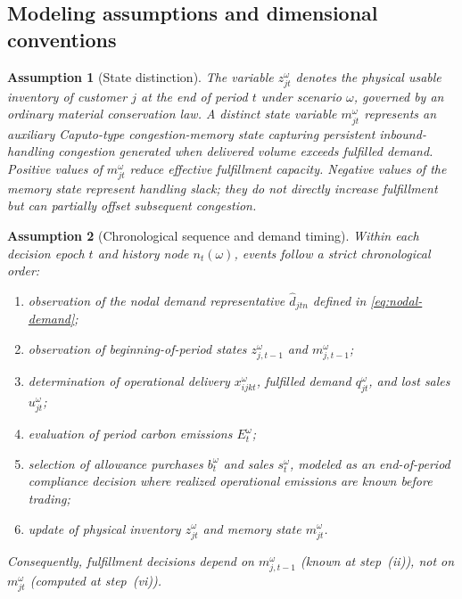 \documentclass[11pt,a4paper]{article}
\newtheorem{assumption}{Assumption}
\begin{document}
\subsection{Modeling assumptions and dimensional conventions}
\label{sec:assumptions}

\begin{assumption}[State distinction]
\label{ass:state}
The variable \(z_{jt}^{\omega}\) denotes the physical usable inventory of
customer \(j\) at the end of period \(t\) under scenario \(\omega\), governed
by an ordinary material conservation law. A distinct state variable \(m_{jt}^{\omega}\) represents an auxiliary
Caputo-type congestion-memory state capturing persistent inbound-handling congestion
generated when delivered volume exceeds fulfilled demand. Positive values
of \(m_{jt}^{\omega}\) reduce effective fulfillment capacity. Negative values of the memory state
represent handling slack; they do not directly increase fulfillment
but can partially offset subsequent congestion.
\end{assumption}

\begin{assumption}[Chronological sequence and demand timing]
\label{ass:chronology}
Within each decision epoch \(t\) and history node \(n_t(\omega)\), events
follow a strict chronological order:
\begin{enumerate}[label=(\roman*)]
  \item observation of the nodal demand representative
  \(\widehat{d}_{jtn}\) defined in \cref{eq:nodal-demand};
  \item observation of beginning-of-period states
  \(z_{j,t-1}^{\omega}\) and \(m_{j,t-1}^{\omega}\);
  \item determination of operational delivery
  \(x_{ijkt}^{\omega}\), fulfilled demand \(q_{jt}^{\omega}\), and
  lost sales \(u_{jt}^{\omega}\);
  \item evaluation of period carbon emissions \(E_t^\omega\);
  \item selection of allowance purchases \(b_t^\omega\) and sales
  \(s_t^\omega\), modeled as an end-of-period compliance decision
  where realized operational emissions are known before trading;
  \item update of physical inventory \(z_{jt}^{\omega}\) and memory
  state \(m_{jt}^{\omega}\).
\end{enumerate}
Consequently, fulfillment decisions depend on \(m_{j,t-1}^{\omega}\)
(known at step~(ii)), not on \(m_{jt}^{\omega}\) (computed at
step~(vi)).
\end{assumption}
\end{document}
